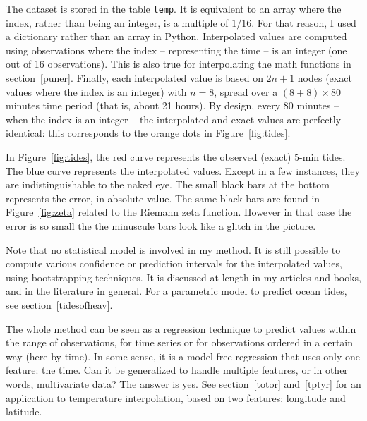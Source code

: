\documentclass[oneside,10pt]{book}
\begin{document}
\noindent The dataset is stored in the table \texttt{temp}. It is equivalent to an array where the index, rather than being an integer, is a multiple of $1/16$. For that reason, I used a dictionary rather than an array in Python. Interpolated values are computed using observations where the index -- representing the time -- is an integer (one out of 16 observations). This is also true for interpolating the math functions in section~\ref{puner}. Finally, each interpolated value is based on $2n + 1$ nodes (exact values where the index is an integer) with $n=8$, spread over a 
$(8 + 8)\times 80$ minutes time period (that is, about 21 hours). By design, every 80 minutes -- when the index is an integer -- the interpolated and exact values are perfectly identical: this corresponds to the orange dots in Figure~\ref{fig:tides}. 

In Figure~\ref{fig:tides}, the red curve represents the observed (exact) 5-min tides. 
The blue curve represents the interpolated values. Except in a few instances, they are indistinguishable to the naked eye. The small black bars at the bottom represents the error, in absolute value. The same black bars are found in Figure~\ref{fig:zeta} related to the Riemann zeta function. However in that case the error is so small the the minuscule bars look like a glitch in the picture.

Note that no statistical model is involved in my method. It is still possible to compute various confidence or prediction intervals for the 
 interpolated values, using bootstrapping techniques. It is discussed at length in my articles and books, and in the literature in general.
For a parametric model to predict ocean tides, see 
 section~\ref{tidesofheav}.

The whole method can be seen as a regression technique to predict values within the range of observations, for time series or for
 observations ordered in a certain way (here by time). In some sense, it is a model-free regression that 
uses only one feature: the time. Can it be generalized to handle multiple features, or in other words, multivariate data? The answer is yes. See section~\ref{totor} and~\ref{tptyr} for an application to temperature interpolation, based on two features: longitude and latitude. 
\end{document}
